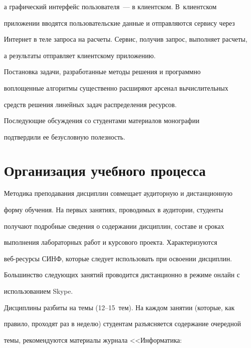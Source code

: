 а графический интерфейс пользователя~--- в клиентском. В~клиентском


приложении вводятся пользовательские данные и отправляются сервису через


Интернет в теле запроса на расчеты. Сервис, получив запрос, выполняет расчеты,


а результаты отправляет клиентскому приложению.





  Постановка задачи, разработанные методы решения и программно


воплощенные алгоритмы существенно расширяют арсенал вычислительных


средств решения линейных задач распределения ресурсов.





  Последующие обсуждения со студентами материалов монографии~\cite{8-kur}


подтвердили ее безусловную полезность.





\section{Организация учебного процесса }





  Методика преподавания дисциплин совмещает аудиторную и дистанционную


форму обучения. На первых занятиях, проводимых в аудитории, студенты


получают подробные сведения о содержании дисциплин, составе и сроках


выполнения лабораторных работ и курсового проекта. Характеризуются


  веб-ре\-сур\-сы СИНФ, которые следует использовать при освоении дисциплин.


Большинство следующих занятий проводится дистанционно в режиме онлайн с


использованием Skype.





  Дисциплины разбиты на темы (12--15~тем). На каждом занятии (которые, как


правило, проходят раз в неделю) студентам разъясняется содержание очередной


темы, рекомендуются материалы журнала <<Информатика:


